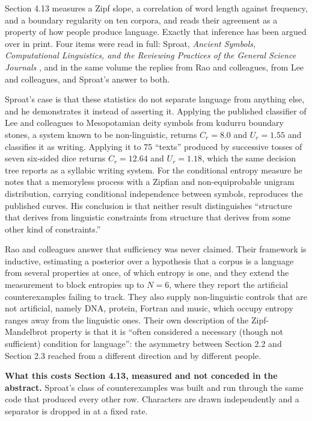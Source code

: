 Section 4.13 measures a Zipf slope, a correlation of word length against frequency, and a boundary regularity on ten corpora, and reads their agreement as a property of how people produce language. Exactly that inference has been argued over in print. Four items were read in full: Sproat, \emph{Ancient Symbols, Computational Linguistics, and the Reviewing Practices of the General Science Journals} \cite{src:Sproat}, and in the same volume the replies from Rao and colleagues, from Lee and colleagues, and Sproat's answer to both.

Sproat's case is that these statistics do not separate language from anything else, and he demonstrates it instead of asserting it. Applying the published classifier of Lee and colleagues to Mesopotamian deity symbols from kudurru boundary stones, a system known to be non-linguistic, returns \(C_r = 8.0\) and \(U_r = 1.55\) and classifies it as writing. Applying it to 75 ``texts'' produced by successive tosses of seven six-sided dice returns \(C_r = 12.64\) and \(U_r = 1.18\), which the same decision tree reports as a syllabic writing system. For the conditional entropy measure he notes that a memoryless process with a Zipfian and non-equiprobable unigram distribution, carrying conditional independence between symbols, reproduces the published curves. His conclusion is that neither result distinguishes ``structure that derives from linguistic constraints from structure that derives from some other kind of constraints.''

Rao and colleagues answer that sufficiency was never claimed. Their framework is inductive, estimating a posterior over a hypothesis that a corpus is a language from several properties at once, of which entropy is one, and they extend the measurement to block entropies up to \(N = 6\), where they report the artificial counterexamples failing to track. They also supply non-linguistic controls that are not artificial, namely DNA, protein, Fortran and music, which occupy entropy ranges away from the linguistic ones. Their own description of the Zipf-Mandelbrot property is that it is ``often considered a necessary (though not sufficient) condition for language'': the asymmetry between Section 2.2 and Section 2.3 reached from a different direction and by different people.

\noindent\textbf{What this costs Section 4.13, measured and not conceded in the abstract.} Sproat's class of counterexamples was built and run through the same code that produced every other row. Characters are drawn independently and a separator is dropped in at a fixed rate.

